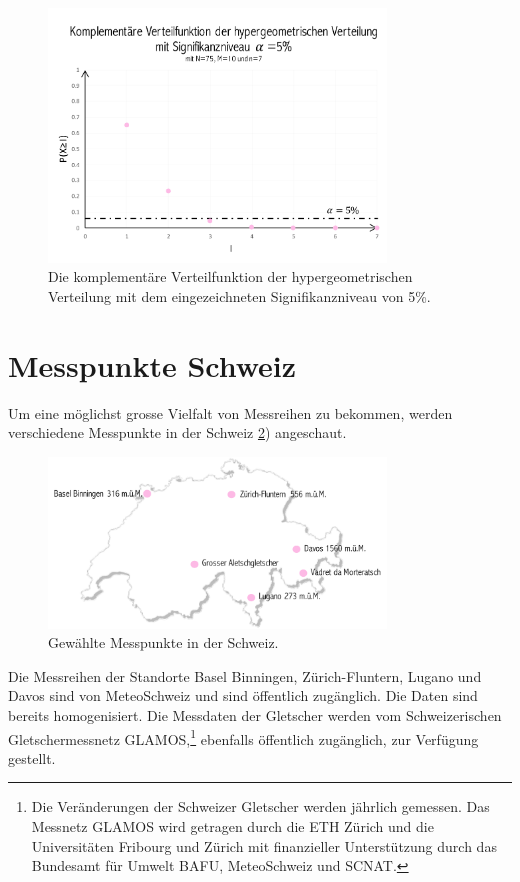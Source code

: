\begin{refsection}
\begin{figure}
\centering
\includegraphics[width=0.8\textwidth]{extrem/SigniAlpha.pdf}
\caption{Die komplementäre Verteilfunktion der hypergeometrischen Verteilung mit dem eingezeichneten Signifikanzniveau von 5\%.}
\label{SigniAlpha}
\end{figure}


\section{Messpunkte Schweiz} \label{MesspunkteSchweiz}
Um eine möglichst grosse Vielfalt von Messreihen zu bekommen, werden verschiedene Messpunkte in der Schweiz \ref{MesspunkteCH}) angeschaut. 

\begin{figure}
\centering
\includegraphics[width=0.8\textwidth]{extrem/Schweiz.pdf}
\caption{Gewählte Messpunkte in der Schweiz.}
\label{MesspunkteCH}
\end{figure}

Die Messreihen der Standorte Basel Binningen, Zürich-Fluntern, Lugano und Davos sind von MeteoSchweiz und sind öffentlich zugänglich. Die Daten sind bereits homogenisiert.
Die Messdaten der Gletscher werden vom Schweizerischen Gletschermessnetz GLAMOS,\footnote{%
Die Veränderungen der Schweizer Gletscher werden jährlich gemessen. Das Messnetz GLAMOS wird getragen durch die ETH Zürich und die Universitäten Fribourg und Zürich mit finanzieller Unterstützung durch das Bundesamt für Umwelt BAFU, MeteoSchweiz und SCNAT.} ebenfalls öffentlich zugänglich, zur Verfügung gestellt.



\end{refsection}
